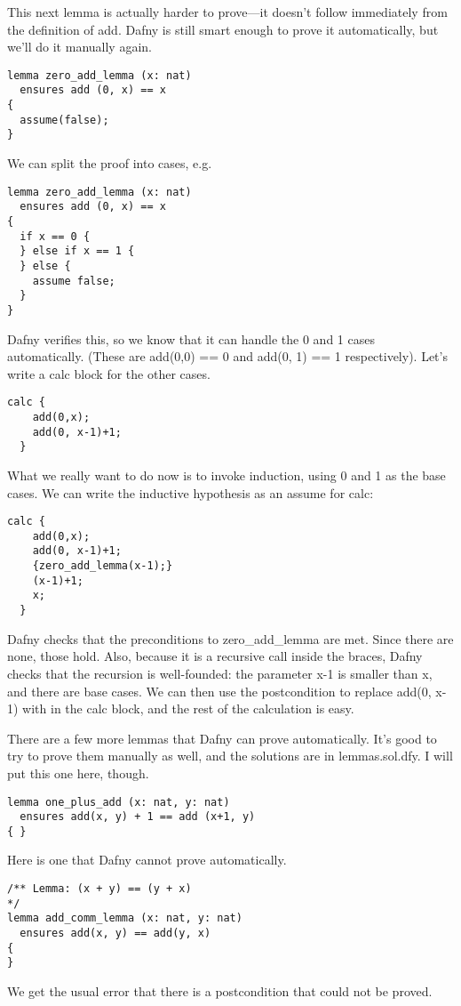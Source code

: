 \documentclass[11pt]{article}
\begin{document}
This next lemma is actually harder to prove---it doesn't follow immediately from the definition of \textsf{add}.
Dafny is still smart enough to prove it automatically, but we'll do it manually again.
\begin{lstlisting}[language=dafny]
lemma zero_add_lemma (x: nat)
  ensures add (0, x) == x
{
  assume(false);
}
\end{lstlisting}
We can split the proof into cases, e.g.
\begin{lstlisting}[language=dafny]
lemma zero_add_lemma (x: nat)
  ensures add (0, x) == x
{
  if x == 0 {
  } else if x == 1 {
  } else {
    assume false;
  }
}
\end{lstlisting}
Dafny verifies this, so we know that it can handle the 0 and 1 cases automatically. (These are \textsf{add(0,0) == 0} and \textsf{add(0, 1) == 1} respectively).
Let's write a \textsf{calc} block for the other cases.
\begin{lstlisting}[language=dafny]
  calc {
    add(0,x);
    add(0, x-1)+1;
  }
\end{lstlisting}
What we really want to do now is to invoke induction, using 0 and 1 as the base cases. We can write the inductive hypothesis as an assume for \textsf{calc}:
\begin{lstlisting}[language=dafny]
  calc {
    add(0,x);
    add(0, x-1)+1;
    {zero_add_lemma(x-1);}
    (x-1)+1;
    x;
  }
\end{lstlisting}
Dafny checks that the preconditions to \textsf{zero\_add\_lemma} are met. Since there are none, those hold. Also, because it is a recursive call inside the
braces, Dafny checks that the recursion is well-founded: the parameter \textsf{x-1} is smaller than \textsf{x}, and there are base cases. We can then use the
postcondition to replace \textsf{add(0, x-1)} with  in the \textsf{calc} block, and the rest of the calculation is easy.

There are a few more lemmas that Dafny can prove automatically. It's
good to try to prove them manually as well, and the solutions are in
\textsf{lemmas.sol.dfy}. I will put this one here, though.

\begin{lstlisting}[language=dafny]
lemma one_plus_add (x: nat, y: nat)
  ensures add(x, y) + 1 == add (x+1, y)
{ }
\end{lstlisting}

Here is one that Dafny cannot prove automatically.

\begin{lstlisting}[language=dafny]
/** Lemma: (x + y) == (y + x)
*/
lemma add_comm_lemma (x: nat, y: nat)
  ensures add(x, y) == add(y, x)
{
}
\end{lstlisting}
We get the usual error that there is a postcondition that could not be proved.
\end{document}
